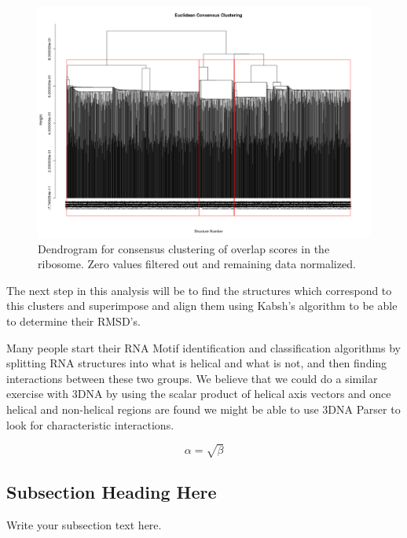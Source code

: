 \documentclass[10pt, oneside, pdftex]{article}
\begin{document}
\begin{figure}[htbp]
\centering 
\includegraphics[angle=90, scale=0.6]{eucli_cons.png}
\caption{Dendrogram for consensus clustering of overlap scores in the ribosome.
Zero values filtered out and remaining data normalized.}
\end{figure}

The next step in this analysis will be to find the structures which
correspond to this clusters and superimpose and align them using
Kabsh's algorithm to be able to determine their RMSD's.

Many people start their RNA Motif identification and classification
algorithms by splitting RNA structures into what is helical and what
is not, and then finding interactions between these two groups. We
believe that we could do a similar exercise with 3DNA by using the scalar
product of helical axis vectors and once helical and non-helical regions are found we might be able to use 3DNA Parser to look for characteristic interactions.


\begin{equation}
    \label{simple_equation}
    \alpha = \sqrt{ \beta }
\end{equation}

\subsection{Subsection Heading Here}
Write your subsection text here.


	
\end{document}
